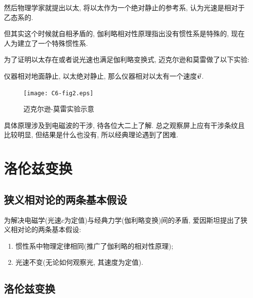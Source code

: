 然后物理学家就提出以太, 将以太作为一个绝对静止的参考系, 认为光速是相对于乙态系的. 

\begin{note}
	
	但其实这个时候就自相矛盾的, 伽利略相对性原理指出没有惯性系是特殊的, 现在人为建立了一个特殊惯性系. 
	
\end{note}

为了证明以太存在或者说光速也满足伽利略变换式, 迈克尔逊和莫雷做了以下实验: 

仪器相对地面静止, 以太绝对静止, 那么仪器相对以太有一个速度$\va*{v}$. 

\begin{figure}[htbp]
	\centering
	\texttt{[image: C6-fig2.eps]}
	\caption{迈克尔逊-莫雷实验示意}
\end{figure}

具体原理涉及到电磁波的干涉, 待各位大二上了解. 总之观察屏上应有干涉条纹且比较明显, 但结果是什么也没有, 所以经典理论遇到了困难. 

\newpage

\section{洛伦兹变换}\label{6.2}

\subsection{狭义相对论的两条基本假设}

为解决电磁学(光速$c$为定值)与经典力学(伽利略变换)间的矛盾, 爱因斯坦提出了狭义相对论的两条基本假设: 

\begin{postulate}[狭义相对论基本假设] \label{C6-po1}
	\begin{enumerate}
		
		\item 惯性系中物理定律相同(推广了伽利略的相对性原理); \label{C6-po1.1}
		
		\item 光速不变(无论如何观察光, 其速度为定值). \label{C6-po1.2}
		
	\end{enumerate}
\end{postulate}

\subsection{洛伦兹变换}

